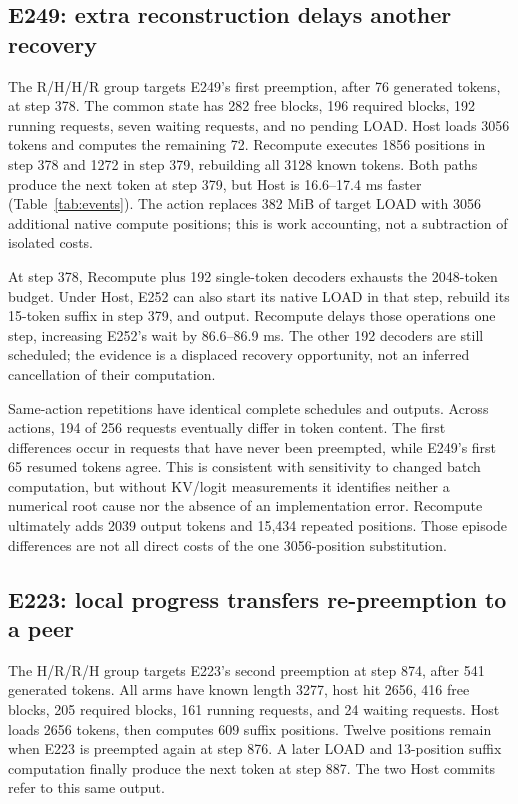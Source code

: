 \documentclass[10pt,a4paper]{article}
\begin{document}
\subsection{E249: extra reconstruction delays another recovery}
The R/H/H/R group targets E249's first preemption, after 76 generated tokens,
at step 378. The common state has 282 free blocks, 196 required blocks, 192
running requests, seven waiting requests, and no pending LOAD. Host loads
3056 tokens and computes the remaining 72. Recompute executes 1856 positions
in step 378 and 1272 in step 379, rebuilding all 3128 known tokens. Both paths
produce the next token at step 379, but Host is 16.6--17.4 ms faster
(Table~\ref{tab:events}). The action replaces 382 MiB of target LOAD with 3056
additional native compute positions; this is work accounting, not a subtraction
of isolated costs.

At step 378, Recompute plus 192 single-token decoders exhausts the 2048-token
budget. Under Host, E252 can also start its native LOAD in that step, rebuild
its 15-token suffix in step 379, and output. Recompute delays those operations
one step, increasing E252's wait by 86.6--86.9 ms. The other 192 decoders are
still scheduled; the evidence is a displaced recovery opportunity, not an
inferred cancellation of their computation.

Same-action repetitions have identical complete schedules and outputs. Across
actions, 194 of 256 requests eventually differ in token content. The first
differences occur in requests that have never been preempted, while E249's first
65 resumed tokens agree. This is consistent with sensitivity to changed batch
computation, but without KV/logit measurements it identifies neither a numerical
root cause nor the absence of an implementation error. Recompute ultimately
adds 2039 output tokens and 15,434 repeated positions. Those episode differences
are not all direct costs of the one 3056-position substitution.

\subsection{E223: local progress transfers re-preemption to a peer}
The H/R/R/H group targets E223's second preemption at step 874, after 541
generated tokens. All arms have known length 3277, host hit 2656, 416 free
blocks, 205 required blocks, 161 running requests, and 24 waiting requests.
Host loads 2656 tokens, then computes 609 suffix positions. Twelve positions
remain when E223 is preempted again at step 876. A later LOAD and 13-position
suffix computation finally produce the next token at step 887. The two Host
commits refer to this same output.
\end{document}
